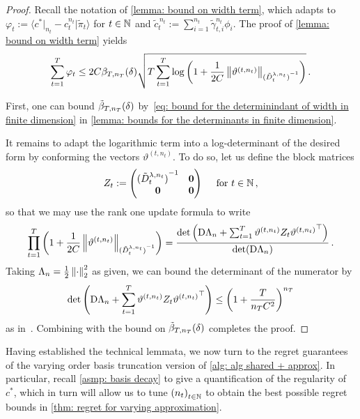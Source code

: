 \begin{proof}
    Recall the notation of \cref{lemma: bound on width term}, which adapts to $\varphi_t:=\langle c^*\vert_{n_t}-c_t^{n_t}\vert \tilde\pi_t\rangle$ for $t\in\mathbb{N}$ and $\tilde c_t^{\, n_t}:= \sum_{i=1}^{n_t}\tilde\gamma^{n_t}_{t,i}\phi_i$. The proof of \cref{lemma: bound on width term} yields 
    \begin{align}
        \sum_{t=1}^T\varphi_t \le 2C\beta_{T,n_T}(\delta)\sqrt{T\sum_{t=1}^T\log\left(1+\frac1{2C}\left\lVert\vartheta^{(t,n_t)}\right\rVert_{{({\tilde{D}_t^{\lambda,n_t}})}^{-1}}\right)}\,.
    \end{align}
    
    First, one can bound $\tilde{\beta}_{T,n_T}(\delta)$ by~\eqref{eq: bound for the determinindant of width in finite dimension} in \cref{lemma: bounds for the determinants in finite dimension}. 

    It remains to adapt the logarithmic term into a log-determinant of the desired form by conforming the vectors $\vartheta^{(t,n_t)}$. To do so, let us define the block matrices
    \[
    Z_t:= \begin{pmatrix}
        {(\tilde{D}_t^{\lambda,n_t})}^{-1} & \bm{0} \\
        \bm{0} & \bm{0}\\
        \end{pmatrix} \quad \mbox{ for } t\in\mathbb{N}\,,
    \]
    so that we may use the rank one update formula to write
    \[
    \prod_{t=1}^T \left(1+\frac1{2C}\left\lVert\vartheta^{(t,n_t)}\right\rVert_{{({\tilde{D}_t^{\lambda,n_t}})}^{-1}}\right) = \frac{\det\left(\mathrm{D}\Lambda_n+ \sum_{t=1}^T \vartheta^{(t,n_t)}Z_t{\vartheta^{(t,n_t)}}^\top\right)}{\det(\mathrm{D}\Lambda_n)}\,.
    \]
    Taking $\Lambda_n=\frac{1}{2}\left\lVert\cdot\right\rVert_{2}^2$ as given, we can bound the determinant of the numerator by
    \[
        {\det\left(\mathrm{D}\Lambda_n+ \sum_{t=1}^T \vartheta^{(t,n_t)}Z_t{\vartheta^{(t,n_t)}}^\top\right)} \le {\left(1+ \frac{T}{n_TC^2}\right)}^{n_T}
    \]
    as in~\cite[Lemma E.3]{abbasi-yadkori_online_2012}. Combining with the bound on $\tilde{\beta}_{T,n_T}(\delta)$ completes the proof.
\end{proof}


Having established the technical lemmata, we now turn to the regret guarantees of the varying order basis truncation version of \cref{alg: alg shared + approx}. In particular, recall \cref{asmp: basis decay} to give a quantification of the regularity of $c^*$, which in turn will allow us to tune ${(n_t)}_{t\in\mathbb{N}}$ to obtain the best possible regret bounds in \cref{thm: regret for varying approximation}.

